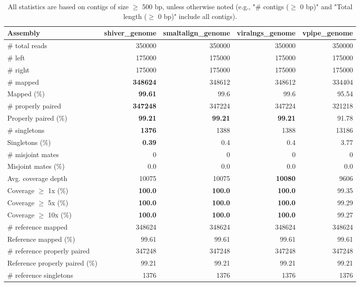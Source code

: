 \documentclass[12pt,a4paper]{article}
\begin{document}
\begin{table}[ht]
\begin{center}
\caption{All statistics are based on contigs of size $\geq$ 500 bp, unless otherwise noted (e.g., "\# contigs ($\geq$ 0 bp)" and "Total length ($\geq$ 0 bp)" include all contigs).}
\begin{tabular}{|l*{4}{|r}|}
\hline
Assembly & shiver\_genome & smaltalign\_genome & viralngs\_genome & vpipe\_genome \\ \hline
\# total reads & 350000 & 350000 & 350000 & 350000 \\ \hline
\# left & 175000 & 175000 & 175000 & 175000 \\ \hline
\# right & 175000 & 175000 & 175000 & 175000 \\ \hline
\# mapped & {\bf 348624} & 348612 & 348612 & 334404 \\ \hline
Mapped (\%) & {\bf 99.61} & 99.6 & 99.6 & 95.54 \\ \hline
\# properly paired & {\bf 347248} & 347224 & 347224 & 321218 \\ \hline
Properly paired (\%) & {\bf 99.21} & {\bf 99.21} & {\bf 99.21} & 91.78 \\ \hline
\# singletons & {\bf 1376} & 1388 & 1388 & 13186 \\ \hline
Singletons (\%) & {\bf 0.39} & 0.4 & 0.4 & 3.77 \\ \hline
\# misjoint mates & 0 & 0 & 0 & 0 \\ \hline
Misjoint mates (\%) & 0.0 & 0.0 & 0.0 & 0.0 \\ \hline
Avg. coverage depth & 10075 & 10075 & {\bf 10080} & 9606 \\ \hline
Coverage $\geq$ 1x (\%) & {\bf 100.0} & {\bf 100.0} & {\bf 100.0} & 99.35 \\ \hline
Coverage $\geq$ 5x (\%) & {\bf 100.0} & {\bf 100.0} & {\bf 100.0} & 99.29 \\ \hline
Coverage $\geq$ 10x (\%) & {\bf 100.0} & {\bf 100.0} & {\bf 100.0} & 99.27 \\ \hline
\# reference mapped & 348624 & 348624 & 348624 & 348624 \\ \hline
Reference mapped (\%) & 99.61 & 99.61 & 99.61 & 99.61 \\ \hline
\# reference properly paired & 347248 & 347248 & 347248 & 347248 \\ \hline
Reference properly paired (\%) & 99.21 & 99.21 & 99.21 & 99.21 \\ \hline
\# reference singletons & 1376 & 1376 & 1376 & 1376 \\ \hline

\end{tabular}
\end{center}
\end{table}
\end{document}
